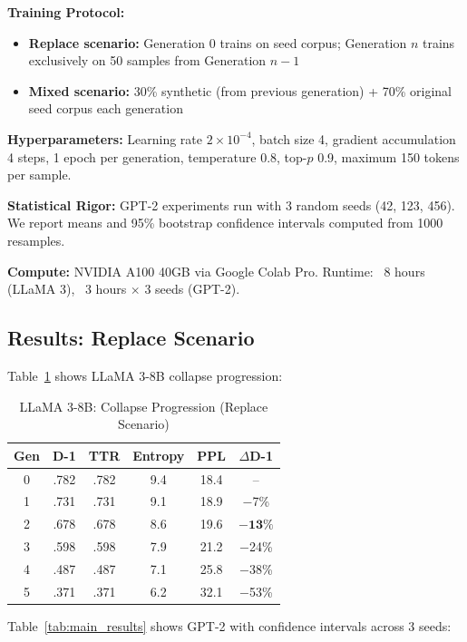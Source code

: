 \documentclass[conference]{IEEEtran}
\begin{document}
\textbf{Training Protocol:}
\begin{itemize}
    \item \textbf{Replace scenario:} Generation 0 trains on seed corpus; Generation $n$ trains exclusively on 50 samples from Generation $n-1$
    \item \textbf{Mixed scenario:} 30\% synthetic (from previous generation) + 70\% original seed corpus each generation
\end{itemize}

\textbf{Hyperparameters:} Learning rate $2\times10^{-4}$, batch size 4, gradient accumulation 4 steps, 1 epoch per generation, temperature 0.8, top-$p$ 0.9, maximum 150 tokens per sample.

\textbf{Statistical Rigor:} GPT-2 experiments run with 3 random seeds (42, 123, 456). We report means and 95\% bootstrap confidence intervals computed from 1000 resamples.

\textbf{Compute:} NVIDIA A100 40GB via Google Colab Pro. Runtime: ~8 hours (LLaMA 3), ~3 hours $\times$ 3 seeds (GPT-2).

\subsection{Results: Replace Scenario}

Table~\ref{tab:llama_results} shows LLaMA 3-8B collapse progression:

\begin{table}[!t]
\caption{LLaMA 3-8B: Collapse Progression (Replace Scenario)}
\label{tab:llama_results}
\centering
\small
\begin{tabular}{@{}cccccc@{}}
\toprule
\textbf{Gen} & \textbf{D-1} & \textbf{TTR} & \textbf{Entropy} & \textbf{PPL} & \textbf{$\Delta$D-1} \\
\midrule
0 & .782 & .782 & 9.4 & 18.4 & -- \\
1 & .731 & .731 & 9.1 & 18.9 & $-$7\% \\
2 & .678 & .678 & 8.6 & 19.6 & $\mathbf{-13\%}$ \\
3 & .598 & .598 & 7.9 & 21.2 & $-$24\% \\
4 & .487 & .487 & 7.1 & 25.8 & $-$38\% \\
5 & .371 & .371 & 6.2 & 32.1 & $-$53\% \\
\bottomrule
\end{tabular}
\end{table}

Table~\ref{tab:main_results} shows GPT-2 with confidence intervals across 3 seeds:
\end{document}
